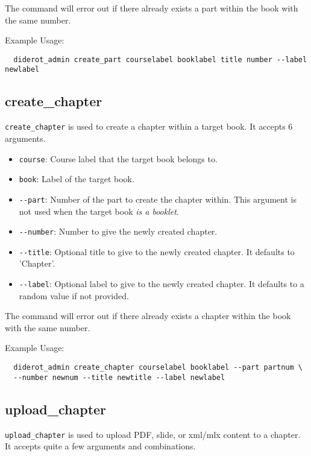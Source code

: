 The command will error out if there already exists a part within the book with the same number.

Example Usage:
\begin{verbatim}
  diderot_admin create_part courselabel booklabel title number --label newlabel
\end{verbatim}


\subsection{create\_chapter}

\verb|create_chapter| is used to create a chapter within a target book. It accepts 6 arguments.

\begin{itemize}
  \item \verb|course|: Course label that the target book belongs to.
  \item \verb|book|: Label of the target book.
  \item \verb|--part|: Number of the part to create the chapter within. This argument is not used when the target book \emph{is a booklet}.
  \item \verb|--number|: Number to give the newly created chapter.
  \item \verb|--title|: Optional title to give to the newly created chapter. It defaults to 'Chapter'.
  \item \verb|--label|: Optional label to give to the newly created chapter. It defaults to a random value if not provided.
\end{itemize}

The command will error out if there already exists a chapter within the book with the same number.

Example Usage:
\begin{verbatim}
  diderot_admin create_chapter courselabel booklabel --part partnum \
  --number newnum --title newtitle --label newlabel
\end{verbatim}

\subsection{upload\_chapter}

\verb|upload_chapter| is used to upload PDF, slide, or xml/mlx content to a chapter.
%
It accepts quite a few arguments and combinations.

